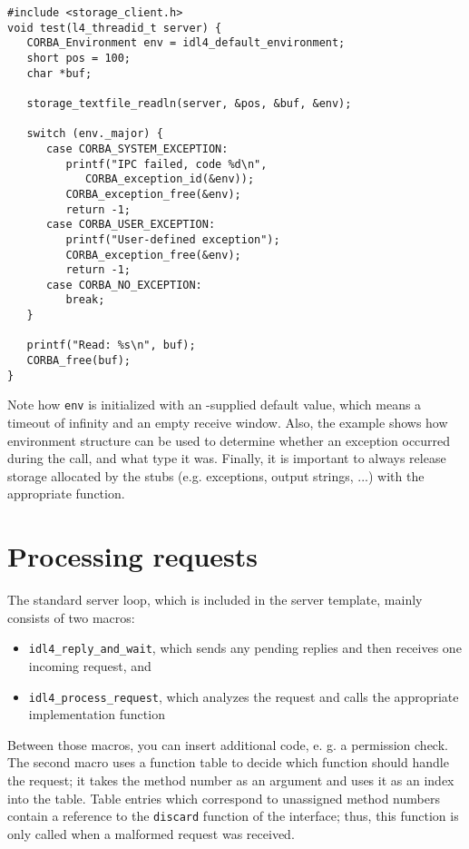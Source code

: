 \begin{center}\begin{minipage}{13cm}\small\begin{verbatim}
#include <storage_client.h>
void test(l4_threadid_t server) {
   CORBA_Environment env = idl4_default_environment;
   short pos = 100;
   char *buf;
  
   storage_textfile_readln(server, &pos, &buf, &env);
  
   switch (env._major) {
      case CORBA_SYSTEM_EXCEPTION: 
         printf("IPC failed, code %d\n", 
            CORBA_exception_id(&env));
         CORBA_exception_free(&env);
         return -1;
      case CORBA_USER_EXCEPTION:
         printf("User-defined exception");
         CORBA_exception_free(&env);
         return -1;
      case CORBA_NO_EXCEPTION:
         break;
   }

   printf("Read: %s\n", buf);
   CORBA_free(buf);
}
\end{verbatim}\end{minipage}\end{center}

Note how \texttt{env} is initialized with an \IDL-supplied default value,
which means a timeout of infinity and an empty receive window. Also, the
example shows how environment structure can be used to determine whether
an exception occurred during the call, and what type it was. Finally,
it is important to always release storage allocated by the stubs (e.g. 
exceptions, output strings, ...) with the appropriate function.

\section{Processing requests}

The standard server loop, which is included in the server template, mainly consists
of two macros:

\begin{itemize}
\item \texttt{idl4\_reply\_and\_wait}, which sends any pending replies and then
receives one incoming request, and
\item \texttt{idl4\_process\_request}, which analyzes the request and calls the
appropriate implementation function
\end{itemize}

Between those macros, you can insert additional code, e. g. a permission check.
The second macro uses a function table to decide which
function should handle the request; it takes the method number as an argument
and uses it as an index into the table. Table entries which correspond to unassigned
method numbers contain a reference to the \texttt{discard} function of the 
interface; thus, this function is only called when a malformed request was received.


